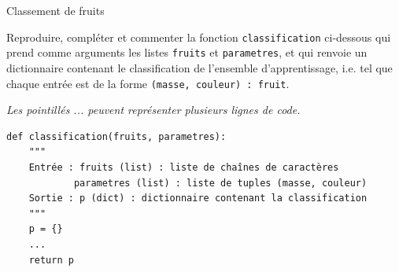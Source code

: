 \begin{exo}[PC][2][devoir]{Classement de fruits}
\begin{quest}

  \item Reproduire, compléter et commenter la fonction \texttt{classification} ci-dessous qui prend comme arguments les listes \texttt{fruits} et \texttt{parametres}, et qui renvoie un dictionnaire contenant le classification de l'ensemble d'apprentissage, i.e. tel que chaque entrée est de la forme \texttt{(masse, couleur) : fruit}.  
  
    \emph{Les pointillés ... peuvent représenter plusieurs lignes de code.}


    \begin{verbatim}
def classification(fruits, parametres):
    """
    Entrée : fruits (list) : liste de chaînes de caractères
            parametres (list) : liste de tuples (masse, couleur)
    Sortie : p (dict) : dictionnaire contenant la classification
    """
    p = {}
    ...
    return p
  \end{verbatim}

\end{quest}


  

\end{exo}
